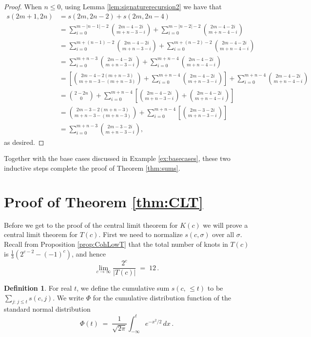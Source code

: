 \documentclass[11pt]{amsart}
\theoremstyle{definition}
\newtheorem{definition}[theorem]{Definition}
\theoremstyle{remark}
\numberwithin{equation}{section}
\begin{document}
\begin{proof}
When $n\leq 0$, using Lemma \ref{lem:signaturerecursion2} 
we have that 
\begin{align*}
    s(2m+1,2n) & =s(2m,2n-2)+s(2m,2n-4) \\
    & = \sum_{i=0}^{m-|n-1|-2}{2m-4-2i\choose m+n-3-i} +\sum_{i=0}^{m-|n-2|-2}{2m-4-2i\choose m+n-4-i} \\
    & = \sum_{i=0}^{m+(n-1)-2}{2m-4-2i\choose m+n-3-i} +\sum_{i=0}^{m+(n-2)-2}{2m-4-2i\choose m+n-4-i} \\
    & = \sum_{i=0}^{m+n-3}{2m-4-2i\choose m+n-3-i} +\sum_{i=0}^{m+n-4}{2m-4-2i\choose m+n-4-i} \\
    & = \left[ {2m-4-2(m+n-3)\choose m+n-3-(m+n-3)} +\sum_{i=0}^{m+n-4}{2m-4-2i\choose m+n-3-i}\right] +\sum_{i=0}^{m+n-4}{2m-4-2i\choose m+n-4-i} \\
    & = {2-2n\choose 0} +\sum_{i=0}^{m+n-4}\left[ {2m-4-2i\choose m+n-3-i} + {2m-4-2i\choose m+n-4-i}\right] \\
    & = {2m-3-2(m+n-3)\choose m+n-3-(m+n-3)} +\sum_{i=0}^{m+n-4}\left[ {2m-3-2i\choose m+n-3-i}\right] \\
    & = \sum_{i=0}^{m+n-3}{2m-3-2i\choose m+n-3-i},
\end{align*}
as desired.
\end{proof}

Together with the base cases discussed in Example \ref{ex:basecases}, these two inductive steps complete the proof of Theorem \ref{thm:sums}.


\section{Proof of Theorem \ref{thm:CLT}}
\label{sec:CLT}


Before we get to the proof of the central limit theorem for $K(c)$ we will prove a central limit theorem for $T(c)$.  First we need to normalize $s(c,\sigma)$ over all $\sigma$.  
Recall from Proposition \ref{prop:CohLowT} that
the total number of knots in $T(c)$ is    $\frac{1}{3} \left(2^{c-2}-(-1)^c\right)$, 
and hence 
\begin{equation}
   \label{eq.Tlim}
   \lim_{c\rightarrow\infty} \frac{2^{c}}{|T(c)|}   \;=\;  12\,.  
\end{equation}



\begin{definition}
For real $t$, we define the cumulative sum $s(c,\,\leq t)$ to be $\sum_{j:\,j\leq t}  s(c,j)$.  
We write $\Phi$ for  the cumulative distribution function of the standard normal distribution
\[   \Phi(t)  \;=\;  \frac{1}{\sqrt{2\pi}} \int_{-\infty}^t e^{-x^2/2}\,dx\,.
\]
\end{definition}
\end{document}
